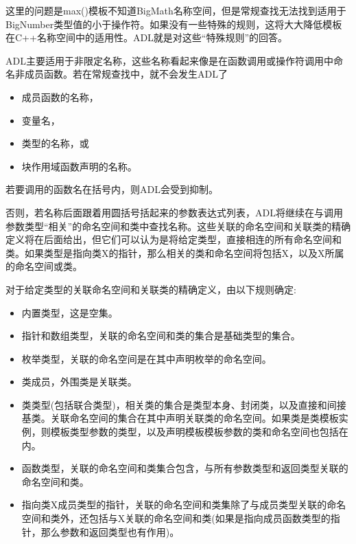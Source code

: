 这里的问题是max()模板不知道BigMath名称空间，但是常规查找无法找到适用于BigNumber类型值的小于操作符。如果没有一些特殊的规则，这将大大降低模板在C++名称空间中的适用性。ADL就是对这些“特殊规则”的回答。



ADL主要适用于非限定名称，这些名称看起来像是在函数调用或操作符调用中命名非成员函数。若在常规查找中，就不会发生ADL了

\begin{itemize}
\item 
成员函数的名称，

\item 
变量名，

\item 
类型的名称，或

\item 
块作用域函数声明的名称。
\end{itemize}

若要调用的函数名在括号内，则ADL会受到抑制。

否则，若名称后面跟着用圆括号括起来的参数表达式列表，ADL将继续在与调用参数类型“相关”的命名空间和类中查找名称。这些关联的命名空间和关联类的精确定义将在后面给出，但它们可以认为是将给定类型，直接相连的所有命名空间和类。如果类型是指向类X的指针，那么相关的类和命名空间将包括X，以及X所属的命名空间或类。

对于给定类型的关联命名空间和关联类的精确定义，由以下规则确定:

\begin{itemize}
\item 
内置类型，这是空集。

\item 
指针和数组类型，关联的命名空间和类的集合是基础类型的集合。

\item 
枚举类型，关联的命名空间是在其中声明枚举的命名空间。

\item 
类成员，外围类是关联类。

\item 
类类型(包括联合类型)，相关类的集合是类型本身、封闭类，以及直接和间接基类。关联命名空间的集合在其中声明关联类的命名空间。如果类是类模板实例，则模板类型参数的类型，以及声明模板模板参数的类和命名空间也包括在内。

\item 
函数类型，关联的命名空间和类集合包含，与所有参数类型和返回类型关联的命名空间和类。

\item 
指向类X成员类型的指针，关联的命名空间和类集除了与成员类型关联的命名空间和类外，还包括与X关联的命名空间和类(如果是指向成员函数类型的指针，那么参数和返回类型也有作用)。
\end{itemize}

